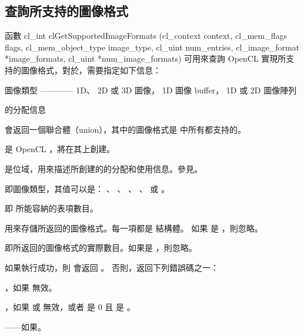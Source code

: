 \subsection{查詢所支持的圖像格式}

函數
\startclc
cl_int clGetSupportedImageFormats (cl_context context,
			cl_mem_flags flags,
			cl_mem_object_type image_type,
			cl_uint num_entries,
			cl_image_format *image_formats,
			cl_uint *num_image_formats)
\stopclc
可用來查詢 OpenCL 實現所支持的圖像格式，對於，需要指定如下信息：
\startigBase
\item {}
\item 圖像類型 ———— 1D、 2D 或 3D 圖像， 1D 圖像 buffer， 1D 或 2D 圖像陣列
\item {}的分配信息
\stopigBase

 會返回一個聯合體（union），其中的圖像格式是  中所有都支持的。

 是 OpenCL ，將在其上創建。

 是位域，用來描述所創建的的分配和使用信息。參見。

 即圖像類型，其值可以是： 、 
、 、 
、  或 
。

 即  所能容納的表項數目。

 用來存儲所返回的圖像格式。每一項都是  結構體。
如果  是 ，則忽略。

 即所返回的圖像格式的實際數目。如果是 ，則忽略。

如果執行成功，則  會返回 。
否則，返回下列錯誤碼之一：

\startigBase
\item {}，如果  無效。

\item {}，如果  或  無效，或者  是 0 且  是 。

\item {}——如果\scdevfailres。

